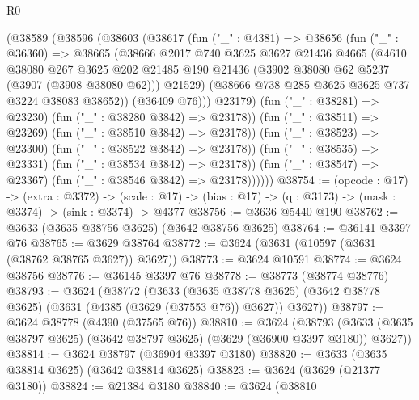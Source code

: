 \begin{lexlean}{R0}
\begin{coremodule}
                (@38589
                  (@38596
                    (@38603
                      (@38617
                        (fun ("_" : @4381) =>
                        @38656
                          (fun ("_" : @36360) =>
                          @38665
                            (@38666
                              @2017
                              @740
                              @3625
                              @3627
                              @21436
                              @4665
                              (@4610
                                @38080
                                @267
                                @3625
                                @202
                                @21485
                                @190
                                @21436
                                (@3902 @38080 @62 @5237 (@3907 (@3908 @38080 @62)))
                                @21529)
                              (@38666 @738 @285 @3625 @3625 @737 @3224 @38083 @38652))
                            (@36409 @76)))
                        @23179)
                      (fun ("_" : @38281) => @23230)
                      (fun ("_" : @38280 @3842) => @23178))
                    (fun ("_" : @38511) => @23269)
                    (fun ("_" : @38510 @3842) => @23178))
                  (fun ("_" : @38523) => @23300)
                  (fun ("_" : @38522 @3842) => @23178))
                (fun ("_" : @38535) => @23331)
                (fun ("_" : @38534 @3842) => @23178))
              (fun ("_" : @38547) => @23367)
              (fun ("_" : @38546 @3842) => @23178))))))
@38754 := (opcode : @17) ->
  (extra : @3372) ->
  (scale : @17) -> (bias : @17) -> (q : @3173) -> (mask : @3374) -> (sink : @3374) -> @4377
@38756 := @3636 @5440 @190
@38762 := @3633 (@3635 @38756 @3625) (@3642 @38756 @3625)
@38764 := @36141 @3397 @76
@38765 := @3629 @38764
@38772 := @3624 (@3631 (@10597 (@3631 (@38762 @38765 @3627)) @3627))
@38773 := @3624 @10591
@38774 := @3624 @38756
@38776 := @36145 @3397 @76
@38778 := @38773 (@38774 @38776)
@38793 := @3624
    (@38772
      (@3633
        (@3635 @38778 @3625)
        (@3642 @38778 @3625)
        (@3631 (@4385 (@3629 (@37553 @76)) @3627))
        @3627))
@38797 := @3624 @38778 (@4390 (@37565 @76))
@38810 := @3624
    (@38793 (@3633 (@3635 @38797 @3625) (@3642 @38797 @3625) (@3629 (@36900 @3397 @3180)) @3627))
@38814 := @3624 @38797 (@36904 @3397 @3180)
@38820 := @3633 (@3635 @38814 @3625) (@3642 @38814 @3625)
@38823 := @3624 (@3629 (@21377 @3180))
@38824 := @21384 @3180
@38840 := @3624
    (@38810

\end{coremodule}
\end{lexlean}
